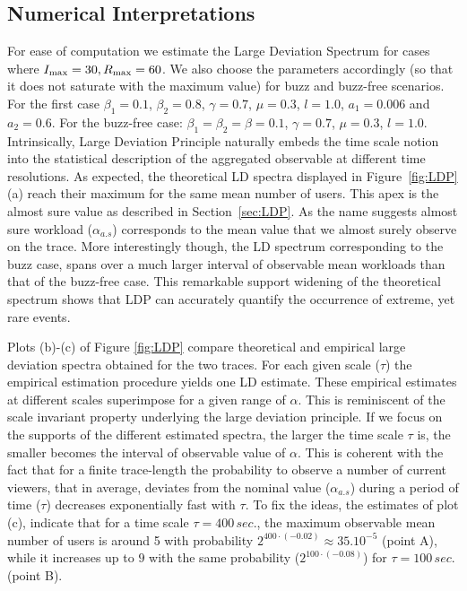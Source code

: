 \documentclass[twoside]{article}
\begin{document}
\subsection{Numerical Interpretations}
\label{sec:interpretation}
For ease of computation we estimate the Large Deviation Spectrum for cases where $I_{\rm max} = 30, R_{\rm max}=60$. We also choose the parameters accordingly (so that it does not saturate with the maximum value) for buzz and buzz-free scenarios. For the first case $\beta_{1} = 0.1$, $\beta_{2} = 0.8$, $\gamma = 0.7$, $\mu = 0.3$, $l = 1.0$, $a_{1}=0.006$ and $a_{2}=0.6$. For the buzz-free case: $\beta_1=\beta_2=\beta= 0.1$, $\gamma = 0.7$, $\mu = 0.3$, $l = 1.0$. 
Intrinsically, Large Deviation Principle naturally embeds the time scale notion into the statistical description of the aggregated observable at different time resolutions. As expected, the theoretical LD spectra displayed in Figure~\ref{fig:LDP}(a) reach their maximum for the same mean number of users. This apex is the almost sure value as described in Section~\ref{sec:LDP}. As the name suggests almost sure workload ($\alpha_{a.s}$) corresponds to the mean value that we almost surely observe on the trace. More interestingly though, the LD spectrum corresponding to the buzz case, spans over a much larger interval of observable mean workloads than that of the buzz-free case. This remarkable support widening of the theoretical spectrum shows that LDP can accurately quantify the occurrence of extreme, yet rare events.

Plots (b)-(c) of Figure \ref{fig:LDP}  compare theoretical and empirical large deviation spectra obtained for the two traces. For each given scale ($\tau$) the empirical estimation procedure yields one LD estimate. These empirical estimates at different scales superimpose for a given range of $\alpha$. This is reminiscent of the scale invariant property underlying the large deviation principle. If we focus on the supports of the different estimated spectra, the larger the time scale $\tau$ is, the smaller becomes the interval of observable value of $\alpha$. This is coherent with the fact that for a finite trace-length the probability to observe a number of current viewers, that in average, deviates from the nominal value ($\alpha_{a.s}$) during a period of time ($\tau$) decreases exponentially fast with $\tau$. To fix the ideas, the estimates of plot (c),  indicate that  for a time scale $\tau =400\,sec.$, the maximum observable mean number of users is around 5 with probability $2^{400\cdot(-0.02)} \approx 35.10^{-5}$ (point A), while it increases up to $9$ with the same probability ($2^{100\cdot(-0.08)}$) for $\tau =100\,sec.$ (point B).
\end{document}
